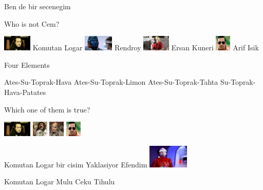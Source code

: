 \documentclass{exam}
\begin{document}
\begin{questions}
\begin{oneparchoices}
Ben de bir secenegim
\end{oneparchoices}
\question Who is not Cem?\newline
\begin{oneparchoices}
\choice \includegraphics[height=2em]{komutanlogar.jpeg}
Komutan Logar
\choice \includegraphics[height=2em]{rendroy2.jpg}
Rendroy
\choice \includegraphics[height=2em]{ersan.jpg}
Ersan Kuneri
\choice \includegraphics[height=2em]{arifisik.jpg}
Arif Isik
\end{oneparchoices}
\question Four Elements\newline
\begin{oneparchoices}
\choice Ates-Su-Toprak-Hava
\choice Ates-Su-Toprak-Limon
\choice Ates-Su-Toprak-Tahta
\choice Su-Toprak-Hava-Patates
\end{oneparchoices}
\question Which one of them is true?\newline
\begin{oneparchoices}
\choice \includegraphics[height=2em]{komutanlogar.jpeg}
\choice \includegraphics[height=2em]{faruk.jpg}
\choice \includegraphics[height=2em]{216.jpg}
\choice \includegraphics[height=2em]{arifisik.jpg}
\end{oneparchoices}
\question Komutan Logar bir cisim Yaklasiyor Efendim\newline
\includegraphics[height=3em]{tihulu.jpeg} \newline
\begin{oneparchoices}
\choice Komutan Logar
\choice Mulu
\choice Ceku
\choice Tihulu
\end{oneparchoices}
\end{questions}
\end{document}
